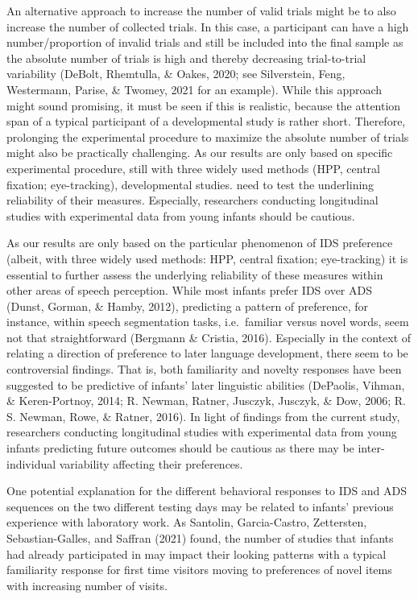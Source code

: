 \documentclass[
  english,
  man,floatsintext]{apa6}
\begin{document}
An alternative approach to increase the number of valid trials might be to also increase the number of collected trials. In this case, a participant can have a high number/proportion of invalid trials and still be included into the final sample as the absolute number of trials is high and thereby decreasing trial-to-trial variability (DeBolt, Rhemtulla, \& Oakes, 2020; see Silverstein, Feng, Westermann, Parise, \& Twomey, 2021 for an example). While this approach might sound promising, it must be seen if this is realistic, because the attention span of a typical participant of a developmental study is rather short. Therefore, prolonging the experimental procedure to maximize the absolute number of trials might also be practically challenging.
As our results are only based on specific experimental procedure, still with three widely used methods (HPP, central fixation; eye-tracking), developmental studies. need to test the underlining reliability of their measures. Especially, researchers conducting longitudinal studies with experimental data from young infants should be cautious.

As our results are only based on the particular phenomenon of IDS preference (albeit, with three widely used methods: HPP, central fixation; eye-tracking) it is essential to further assess the underlying reliability of these measures within other areas of speech perception. While most infants prefer IDS over ADS (Dunst, Gorman, \& Hamby, 2012), predicting a pattern of preference, for instance, within speech segmentation tasks, i.e.~familiar versus novel words, seem not that straightforward (Bergmann \& Cristia, 2016). Especially in the context of relating a direction of preference to later language development, there seem to be controversial findings. That is, both familiarity and novelty responses have been suggested to be predictive of infants' later linguistic abilities (DePaolis, Vihman, \& Keren-Portnoy, 2014; R. Newman, Ratner, Jusczyk, Jusczyk, \& Dow, 2006; R. S. Newman, Rowe, \& Ratner, 2016). In light of findings from the current study, researchers conducting longitudinal studies with experimental data from young infants predicting future outcomes should be cautious as there may be inter-individual variability affecting their preferences.

One potential explanation for the different behavioral responses to IDS and ADS sequences on the two different testing days may be related to infants' previous experience with laboratory work. As Santolin, Garcia-Castro, Zettersten, Sebastian-Galles, and Saffran (2021) found, the number of studies that infants had already participated in may impact their looking patterns with a typical familiarity response for first time visitors moving to preferences of novel items with increasing number of visits.
\end{document}
